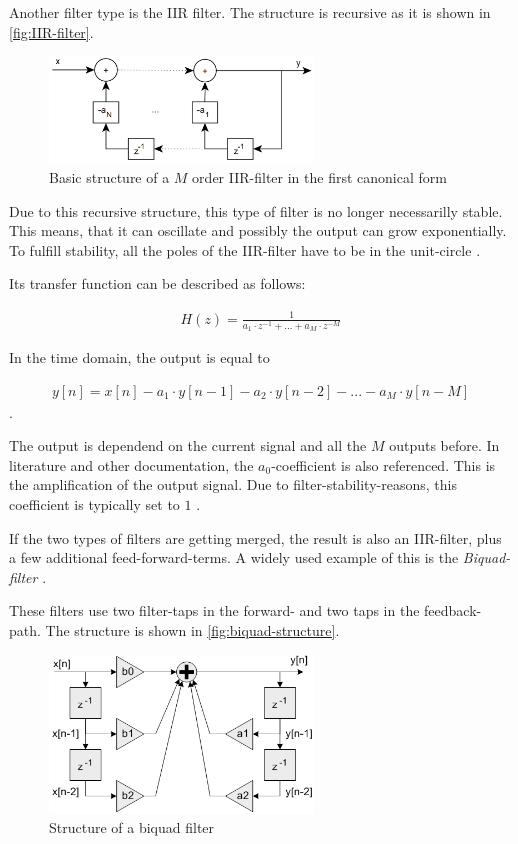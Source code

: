 Another filter type is the \ac{IIR} filter. The structure is recursive as it is shown in \autoref{fig:IIR-filter}.

\begin{figure}[!h]
    \centering
    \includegraphics[width=7cm]{img/iir.png}
    \caption{Basic structure of a $M$ order \ac{IIR}-filter in the first canonical form \cite{meyer_signalverarbeitung}}
    \label{fig:IIR-filter}
\end{figure}

Due to this recursive structure, this type of filter is no longer necessarilly stable. This means, that it can
oscillate and possibly the output can grow exponentially. To fulfill stability, all the poles of the
\ac{IIR}-filter have to be in the unit-circle \cite{meyer_signalverarbeitung}.

Its transfer function can be described as follows:

\begin{align}
    H(z) = \frac{1}{a_1 \cdot z^{-1} + ... + a_M \cdot z^{-M}}
\end{align}

In the time domain, the output is equal to

\begin{align}
    y[n] = x[n] - a_1 \cdot y[n-1] - a_2 \cdot y[n-2] - ... - a_M \cdot y[n-M]
\end{align}
.

The output is dependend on the current signal and all the $M$ outputs before. In literature and other documentation,
the $a_0$-coefficient is also referenced. This is the amplification of the output signal. Due to filter-stability-reasons,
this coefficient is typically set to $1$ \cite{arm_dsp} \cite{cookbook_audio}.

If the two types of filters are getting merged, the result is also an \ac{IIR}-filter, plus
a few additional feed-forward-terms. A widely used example of this is the \textit{Biquad-filter} \cite{arm_dsp}.

These filters use two filter-taps in the forward- and two taps in the feedback-path. The structure
is shown in \autoref{fig:biquad-structure}.

\begin{figure}[!h]
    \centering
    \includegraphics[width=7cm]{img/biquad_structure.png}
    \caption{Structure of a biquad filter \cite{arm_dsp}}
    \label{fig:biquad-structure}
\end{figure}

